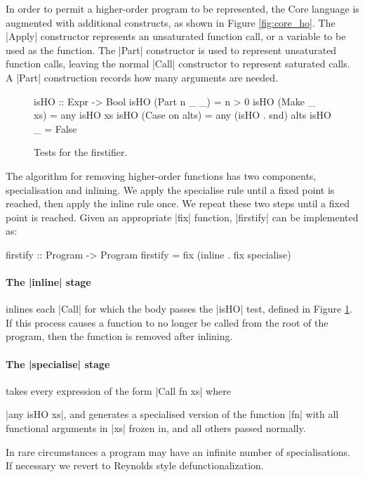 In order to permit a higher-order program to be represented, the Core language is augmented with additional constructs, as shown in Figure \ref{fig:core_ho}. The |Apply| constructor represents an unsaturated function call, or a variable to be used as the function. The |Part| constructor is used to represent unsaturated function calls, leaving the normal |Call| constructor to represent saturated calls. A |Part| construction records how many arguments are needed.

\begin{figure}
\ignore\begin{code}
isHO :: Expr -> Bool
isHO (Part n _ _)    = n > 0
isHO (Make _ xs)     = any isHO xs
isHO (Case on alts)  = any (isHO . snd) alts
isHO _               = False
\end{code}
\caption{Tests for the firstifier.}
\label{fig:isHO}
\figureend
\end{figure}

The algorithm for removing higher-order functions has two components, specialisation and inlining. We apply the specialise rule until a fixed point is reached, then apply the inline rule once. We repeat these two steps until a fixed point is reached. Given an appropriate |fix| function, |firstify| can be implemented as:

\ignore\begin{code}
firstify :: Program -> Program
firstify = fix (inline . fix specialise)
\end{code}

\paragraph{The |inline| stage} inlines each |Call| for which the body passes the |isHO| test, defined in Figure \ref{fig:isHO}. If this process causes a function to no longer be called from the root of the program, then the function is removed after inlining.

\paragraph{The |specialise| stage} takes every expression of the form |Call fn xs| where \ignore|any isHO xs|, and generates a specialised version of the function |fn| with all functional arguments in |xs| frozen in, and all others passed normally.

In rare circumstances a program may have an infinite number of specialisations. If necessary we revert to Reynolds style defunctionalization.

